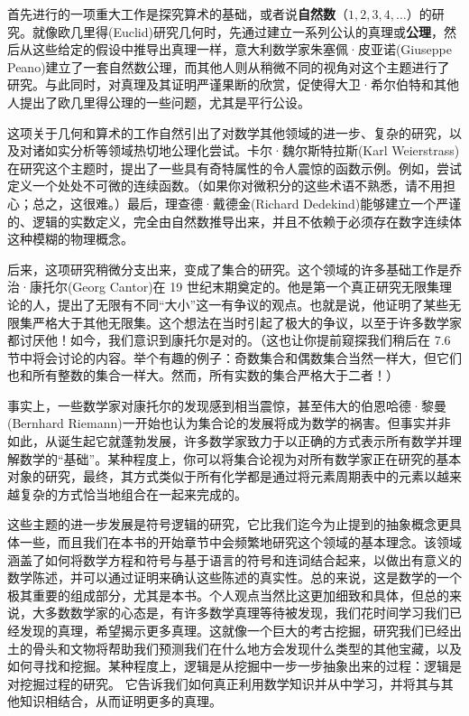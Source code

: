 首先进行的一项重大工作是探究算术的基础，或者说\textbf{自然数}（$1,2,3,4,\dots$）的研究。就像欧几里得(Euclid)研究几何时，先通过建立一系列公认的真理或\textbf{公理}，然后从这些给定的假设中推导出真理一样，意大利数学家朱塞佩·皮亚诺(Giuseppe Peano)建立了一套自然数公理，而其他人则从稍微不同的视角对这个主题进行了研究。与此同时，对真理及其证明严谨果断的欣赏，促使得大卫·希尔伯特和其他人提出了欧几里得公理的一些问题，尤其是平行公设。

这项关于几何和算术的工作自然引出了对数学其他领域的进一步、复杂的研究，以及对诸如实分析等领域热切地公理化尝试。卡尔·魏尔斯特拉斯(Karl Weierstrass)在研究这个主题时，提出了一些具有奇特属性的令人震惊的函数示例。例如，尝试定义一个处处不可微的连续函数。（如果你对微积分的这些术语不熟悉，请不用担心；总之，这很难。）最后，理查德·戴德金(Richard Dedekind)能够建立一个严谨的、逻辑的实数定义，完全由自然数推导出来，并且不依赖于必须存在数字连续体这种模糊的物理概念。

后来，这项研究稍微分支出来，变成了集合的研究。这个领域的许多基础工作是乔治·康托尔(Georg Cantor)在 19 世纪末期奠定的。他是第一个真正研究无限集理论的人，提出了无限有不同``大小''这一有争议的观点。也就是说，他证明了某些无限集严格大于其他无限集。这个想法在当时引起了极大的争议，以至于许多数学家都讨厌他！如今，我们意识到康托尔是对的。（这也让你提前窥探我们稍后在 7.6节中将会讨论的内容。举个有趣的例子：奇数集合和偶数集合当然一样大，但它们也和所有整数的集合一样大。然而，所有实数的集合严格大于二者！）

事实上，一些数学家对康托尔的发现感到相当震惊，甚至伟大的伯恩哈德·黎曼(Bernhard Riemann)一开始也认为集合论的发展将成为数学的祸害。但事实并非如此，从诞生起它就蓬勃发展，许多数学家致力于以正确的方式表示所有数学并理解数学的``基础''。某种程度上，你可以将集合论视为对所有数学家正在研究的基本对象的研究，最终，其方式类似于所有化学都是通过将元素周期表中的元素以越来越复杂的方式恰当地组合在一起来完成的。

这些主题的进一步发展是符号逻辑的研究，它比我们迄今为止提到的抽象概念更具体一些，而且我们在本书的开始章节中会频繁地研究这个领域的基本理念。该领域涵盖了如何将数学方程和符号与基于语言的符号和连词结合起来，以做出有意义的数学陈述，并可以通过证明来确认这些陈述的真实性。总的来说，这是数学的一个极其重要的组成部分，尤其是本书。个人观点当然比这更加细致和具体，但总的来说，大多数数学家的心态是，有许多数学真理等待被发现，我们花时间学习我们已经发现的真理，希望揭示更多真理。这就像一个巨大的考古挖掘，研究我们已经出土的骨头和文物将帮助我们预测我们在什么地方会发现什么类型的其他宝藏，以及如何寻找和挖掘。某种程度上，逻辑是从挖掘中一步一步抽象出来的过程：逻辑是对挖掘过程的研究。 它告诉我们如何真正利用数学知识并从中学习，并将其与其他知识相结合，从而证明更多的真理。

